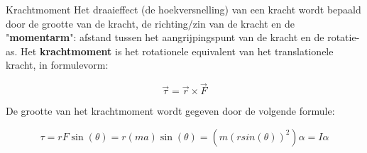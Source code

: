 \begin{theo}[Krachtmoment]{Krachtmoment}
    Het draaieffect (de hoekversnelling) van een kracht wordt bepaald door de grootte van de kracht, de richting/zin van de kracht en de "\textbf{momentarm}": afstand tussen het aangrijpingspunt van de kracht en de rotatie-as. Het \textbf{krachtmoment} is het rotationele equivalent van het translationele kracht, in formulevorm:

    \begin{equation*}
        \Vec{\tau} = \Vec{r} \times \Vec{F}
    \end{equation*}

    \noindent De grootte van het krachtmoment wordt gegeven door de volgende formule:

    \begin{equation*}
       \tau = rF\sin(\theta) = r(ma)\sin(\theta) = (m(rsin(\theta))^2)\alpha = I\alpha
    \end{equation*}


\end{theo}

